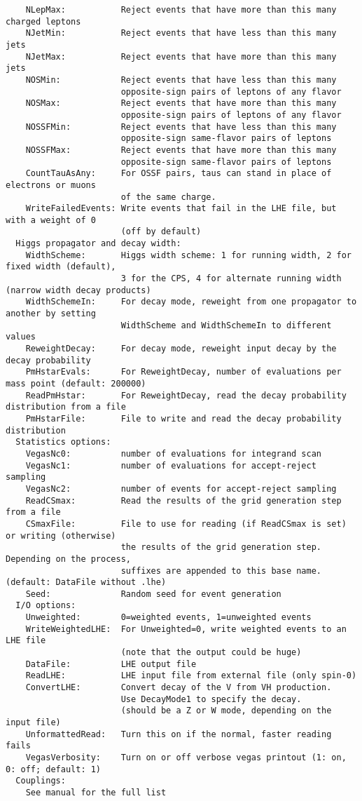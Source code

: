 \documentclass[aps,superscriptaddress,nofootinbib]{revtex4}
\begin{document}
\begin{verbatim}
    NLepMax:           Reject events that have more than this many charged leptons
    NJetMin:           Reject events that have less than this many jets
    NJetMax:           Reject events that have more than this many jets
    NOSMin:            Reject events that have less than this many
                       opposite-sign pairs of leptons of any flavor
    NOSMax:            Reject events that have more than this many
                       opposite-sign pairs of leptons of any flavor
    NOSSFMin:          Reject events that have less than this many
                       opposite-sign same-flavor pairs of leptons
    NOSSFMax:          Reject events that have more than this many
                       opposite-sign same-flavor pairs of leptons
    CountTauAsAny:     For OSSF pairs, taus can stand in place of electrons or muons
                       of the same charge.
    WriteFailedEvents: Write events that fail in the LHE file, but with a weight of 0
                       (off by default)
  Higgs propagator and decay width:
    WidthScheme:       Higgs width scheme: 1 for running width, 2 for fixed width (default),
                       3 for the CPS, 4 for alternate running width (narrow width decay products)
    WidthSchemeIn:     For decay mode, reweight from one propagator to another by setting
                       WidthScheme and WidthSchemeIn to different values
    ReweightDecay:     For decay mode, reweight input decay by the decay probability
    PmHstarEvals:      For ReweightDecay, number of evaluations per mass point (default: 200000)
    ReadPmHstar:       For ReweightDecay, read the decay probability distribution from a file
    PmHstarFile:       File to write and read the decay probability distribution
  Statistics options:
    VegasNc0:          number of evaluations for integrand scan
    VegasNc1:          number of evaluations for accept-reject sampling
    VegasNc2:          number of events for accept-reject sampling
    ReadCSmax:         Read the results of the grid generation step from a file
    CSmaxFile:         File to use for reading (if ReadCSmax is set) or writing (otherwise)
                       the results of the grid generation step.  Depending on the process,
                       suffixes are appended to this base name. (default: DataFile without .lhe)
    Seed:              Random seed for event generation
  I/O options:
    Unweighted:        0=weighted events, 1=unweighted events
    WriteWeightedLHE:  For Unweighted=0, write weighted events to an LHE file
                       (note that the output could be huge)
    DataFile:          LHE output file
    ReadLHE:           LHE input file from external file (only spin-0)
    ConvertLHE:        Convert decay of the V from VH production.
                       Use DecayMode1 to specify the decay.
                       (should be a Z or W mode, depending on the input file)
    UnformattedRead:   Turn this on if the normal, faster reading fails
    VegasVerbosity:    Turn on or off verbose vegas printout (1: on, 0: off; default: 1)
  Couplings:
    See manual for the full list
\end{verbatim}
\end{document}
